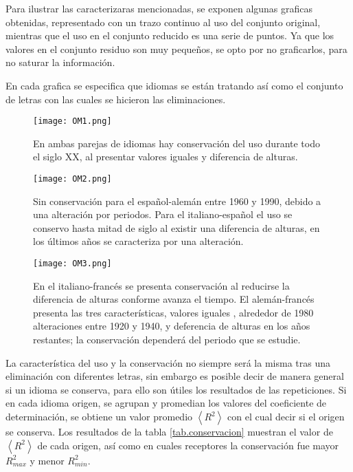 Para ilustrar las caracterizaras mencionadas, se exponen algunas graficas obtenidas, representado con un trazo continuo al uso del conjunto original, mientras que el uso en el conjunto reducido  es una serie de puntos.   Ya que los valores en el conjunto residuo son muy pequeños, se opto por no graficarlos, para no saturar la información. 

En cada grafica se especifica que idiomas se están tratando así como el conjunto de letras con las cuales se hicieron las eliminaciones. 



\begin{figure}[h!]
	\centering
	\texttt{[image: OM1.png]}
	\label{fig.OM1}
	\caption{En ambas parejas de idiomas hay conservación del uso durante todo el siglo XX, al presentar valores iguales y  diferencia de alturas.}
\end{figure}


\begin{figure}[h!]
	\centering
	\texttt{[image: OM2.png]}
	\label{fig.OM2}
	\caption{Sin conservación para el español-alemán entre 1960 y 1990,  debido a una alteración por periodos. Para el italiano-español el uso se conservo hasta mitad de siglo al existir una diferencia de alturas, en los últimos años se caracteriza por una alteración.}
\end{figure}

\clearpage
\begin{figure}[h!]
	\centering
	\texttt{[image: OM3.png]}
	\label{fig.OM3}
	\caption{ En el italiano-francés se presenta conservación al  reducirse la diferencia de alturas conforme avanza el tiempo. El alemán-francés  presenta las tres características,  valores iguales  , alrededor de 1980  alteraciones entre 1920 y 1940, y deferencia de alturas  en los años restantes; la conservación dependerá del periodo  que se estudie.}
\end{figure}




La característica del uso y la conservación no siempre será la misma tras una eliminación con diferentes letras, sin embargo es posible decir de manera general si un idioma se conserva, para ello son útiles los resultados de las repeticiones. Si en cada idioma origen, se agrupan y promedian los valores del coeficiente de determinación,  se obtiene un valor promedio $\left \langle R^{2}  \right \rangle$ con el cual decir si el origen se conserva.  Los resultados de la tabla \ref{tab.conservacion} muestran el valor de  $\left \langle R^{2} \right \rangle$ de cada origen,  así como en cuales receptores la conservación fue mayor $R^{2}_{max}$ y  menor $R^{2}_{min}$.





